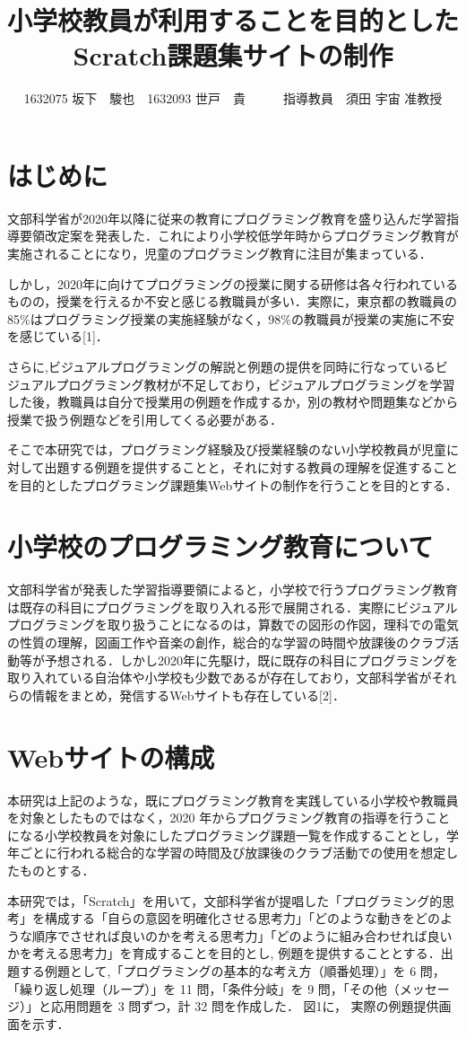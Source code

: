 \documentclass[twocolumn,10pt,a4j]{jsarticle}
\title{小学校教員が利用することを目的としたScratch課題集サイトの制作}
\author{1632075 坂下　駿也　1632093 世戸　\UTF{FA1A}貴　　　指導教員　須田 宇宙 准教授}
\date{}
\begin{document}
\maketitle

\section{はじめに}

文部科学省が2020年以降に従来の教育にプログラミング教育を盛り込んだ学習指導要領改定案を発表した．これにより小学校低学年時からプログラミング教育が実施されることになり，児童のプログラミング教育に注目が集まっている．

しかし，2020年に向けてプログラミングの授業に関する研修は各々行われているものの，授業を行えるか不安と感じる教職員が多い．実際に，東京都の教職員の85\%はプログラミング授業の実施経験がなく，98\%の教職員が授業の実施に不安を感じている[1]．

さらに,ビジュアルプログラミングの解説と例題の提供を同時に行なっているビジュアルプログラミング教材が不足しており，ビジュアルプログラミングを学習した後，教職員は自分で授業用の例題を作成するか，別の教材や問題集などから授業で扱う例題などを引用してくる必要がある．

そこで本研究では，プログラミング経験及び授業経験のない小学校教員が児童に対して出題する例題を提供することと，それに対する教員の理解を促進することを目的としたプログラミング課題集Webサイトの制作を行うことを目的とする．

\section{小学校のプログラミング教育について}
文部科学省が発表した学習指導要領によると，小学校で行うプログラミング教育は既存の科目にプログラミングを取り入れる形で展開される．実際にビジュアルプログラミングを取り扱うことになるのは，算数での図形の作図，理科での電気の性質の理解，図画工作や音楽の創作，総合的な学習の時間や放課後のクラブ活動等が予想される．しかし2020年に先駆け，既に既存の科目にプログラミングを取り入れている自治体や小学校も少数であるが存在しており，文部科学省がそれらの情報をまとめ，発信するWebサイトも存在している[2]．

\section{Webサイトの構成}
本研究は上記のような，既にプログラミング教育を実践している小学校や教職員を対象としたものではなく，2020 年からプログラミング教育の指導を行うことになる小学校教員を対象にしたプログラミング課題一覧を作成することとし，学年ごとに行われる総合的な学習の時間及び放課後のクラブ活動での使用を想定したものとする．\par
本研究では，「Scratch」を用いて，文部科学省が提唱した「プログラミング的思考」を構成する「自らの意図を明確化させる思考力」「どのような動きをどのような順序でさせれば良いのかを考える思考力」「どのように組み合わせれば良いかを考える思考力」を育成することを目的とし, 例題を提供することとする．出題する例題として,「プログラミングの基本的な考え方（順番処理）」を 6 問，「繰り返し処理（ループ）」を 11 問，「条件分岐」を 9 問，「その他（メッセージ）」と応用問題を 3 問ずつ，計 32 問を作成した． 図1に， 実際の例題提供画面を示す．
\end{document}
